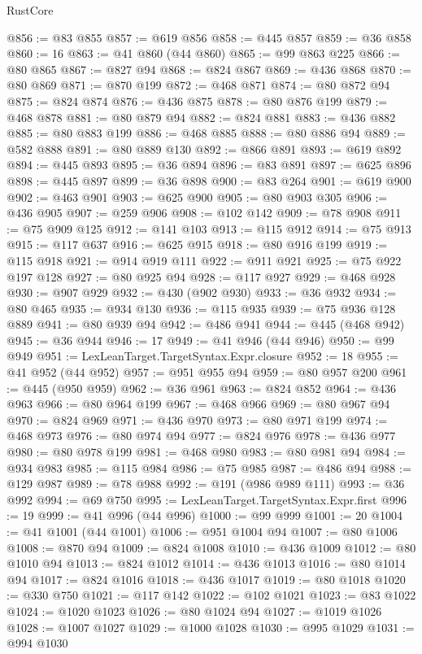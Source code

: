 \begin{lexlean}{RustCore}
\begin{coremodule}
@856 := @83 @855
@857 := @619 @856
@858 := @445 @857
@859 := @36 @858
@860 := 16
@863 := @41 @860 (@44 @860)
@865 := @99 @863 @225
@866 := @80 @865
@867 := @827 @94
@868 := @824 @867
@869 := @436 @868
@870 := @80 @869
@871 := @870 @199
@872 := @468 @871
@874 := @80 @872 @94
@875 := @824 @874
@876 := @436 @875
@878 := @80 @876 @199
@879 := @468 @878
@881 := @80 @879 @94
@882 := @824 @881
@883 := @436 @882
@885 := @80 @883 @199
@886 := @468 @885
@888 := @80 @886 @94
@889 := @582 @888
@891 := @80 @889 @130
@892 := @866 @891
@893 := @619 @892
@894 := @445 @893
@895 := @36 @894
@896 := @83 @891
@897 := @625 @896
@898 := @445 @897
@899 := @36 @898
@900 := @83 @264
@901 := @619 @900
@902 := @463 @901
@903 := @625 @900
@905 := @80 @903 @305
@906 := @436 @905
@907 := @259 @906
@908 := @102 @142
@909 := @78 @908
@911 := @75 @909 @125
@912 := @141 @103
@913 := @115 @912
@914 := @75 @913
@915 := @117 @637
@916 := @625 @915
@918 := @80 @916 @199
@919 := @115 @918
@921 := @914 @919 @111
@922 := @911 @921
@925 := @75 @922 @197 @128
@927 := @80 @925 @94
@928 := @117 @927
@929 := @468 @928
@930 := @907 @929
@932 := @430 (@902 @930)
@933 := @36 @932
@934 := @80 @465
@935 := @934 @130
@936 := @115 @935
@939 := @75 @936 @128 @889
@941 := @80 @939 @94
@942 := @486 @941
@944 := @445 (@468 @942)
@945 := @36 @944
@946 := 17
@949 := @41 @946 (@44 @946)
@950 := @99 @949
@951 := LexLeanTarget.TargetSyntax.Expr.closure
@952 := 18
@955 := @41 @952 (@44 @952)
@957 := @951 @955 @94
@959 := @80 @957 @200
@961 := @445 (@950 @959)
@962 := @36 @961
@963 := @824 @852
@964 := @436 @963
@966 := @80 @964 @199
@967 := @468 @966
@969 := @80 @967 @94
@970 := @824 @969
@971 := @436 @970
@973 := @80 @971 @199
@974 := @468 @973
@976 := @80 @974 @94
@977 := @824 @976
@978 := @436 @977
@980 := @80 @978 @199
@981 := @468 @980
@983 := @80 @981 @94
@984 := @934 @983
@985 := @115 @984
@986 := @75 @985
@987 := @486 @94
@988 := @129 @987
@989 := @78 @988
@992 := @191 (@986 @989 @111)
@993 := @36 @992
@994 := @69 @750
@995 := LexLeanTarget.TargetSyntax.Expr.first
@996 := 19
@999 := @41 @996 (@44 @996)
@1000 := @99 @999
@1001 := 20
@1004 := @41 @1001 (@44 @1001)
@1006 := @951 @1004 @94
@1007 := @80 @1006
@1008 := @870 @94
@1009 := @824 @1008
@1010 := @436 @1009
@1012 := @80 @1010 @94
@1013 := @824 @1012
@1014 := @436 @1013
@1016 := @80 @1014 @94
@1017 := @824 @1016
@1018 := @436 @1017
@1019 := @80 @1018
@1020 := @330 @750
@1021 := @117 @142
@1022 := @102 @1021
@1023 := @83 @1022
@1024 := @1020 @1023
@1026 := @80 @1024 @94
@1027 := @1019 @1026
@1028 := @1007 @1027
@1029 := @1000 @1028
@1030 := @995 @1029
@1031 := @994 @1030

\end{coremodule}
\end{lexlean}
